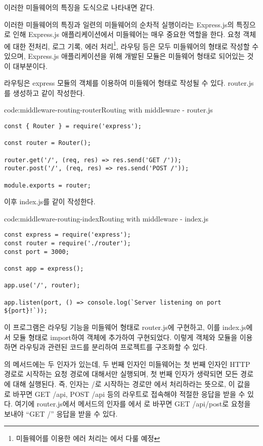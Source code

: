 이러한 미들웨어의 특징을 도식으로 나타내면 \와 같다.


이러한 미들웨어의 특징과 일련의 미들웨어의 순차적 실행이라는 Express.js의 특징으로 인해 Express.js 애플리케이션에서 미들웨어는 매우 중요한 역할을 한다. 요청 객체에 대한 전처리, 로그 기록, 에러 처리\footnote{미들웨어를 이용한 에러 처리는 에서 다룰 예정}, 라우팅 등은 모두 미들웨어의 형태로 작성할 수 있으며, Express.js 애플리케이션을 위해 개발된 모듈은 미들웨어 형태로 되어있는 것이 대부분이다.

라우팅은 express 모듈의  객체를 이용하여 미들웨어 형태로 작성될 수 있다. router.js를 생성하고 \와 같이 작성한다.

\begin{code}{code:middleware-routing-router}{Routing with middleware - router.js}
\begin{verbatim}
const { Router } = require('express');

const router = Router();

router.get('/', (req, res) => res.send('GET /'));
router.post('/', (req, res) => res.send('POST /'));

module.exports = router;
\end{verbatim}
\end{code}
\clearpage

이후 index.js를 \와 같이 작성한다.

\begin{code}{code:middleware-routing-index}{Routing with middleware - index.js}
\begin{verbatim}
const express = require('express');
const router = require('./router');
const port = 3000;

const app = express();

app.use('/', router);

app.listen(port, () => console.log(`Server listening on port ${port}!`));
\end{verbatim}
\end{code}

이 프로그램은 라우팅 기능을 미들웨어 형태로 router.js에 구현하고, 이를 index.js에서 모듈 형태로 import하여  객체에 추가하여 구현되었다. 이렇게  객체와 모듈을 이용하면 라우팅과 관련된 코드를 분리하여 프로젝트를 구조화할 수 있다.

의  메서드에는 두 인자가 있는데, 두 번째 인자인 미들웨어는 첫 번째 인자인 HTTP 경로로 시작하는 요청 경로에 대해서만 실행되며, 첫 번째 인자가 생략되면 모든 경로에 대해 실행된다. 즉,  인자는 /로 시작하는 경로만 에서 처리하라는 뜻으로, 이 값을 로 바꾸면 GET /api, POST /api 등의 라우트로 접속해야 적절한 응답을 받을 수 있다. 여기에 router.js에서  메서드의 인자를 에서 로 바꾸면 GET /api/post로 요청을 보내야 ``GET /'' 응답을 받을 수 있다.

